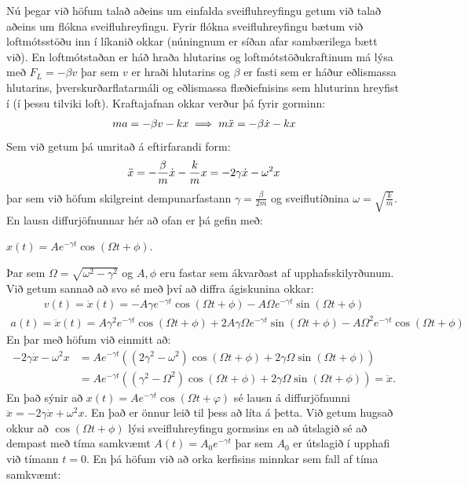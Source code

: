 \ifdefined \wholebook \else\documentclass[oneside]{book}\usepackage{EdlBook}\graphicspath{{figures/}}
\begin{document}
Nú þegar við höfum talað aðeins um einfalda sveifluhreyfingu getum við talað aðeins um flókna sveifluhreyfingu. Fyrir flókna sveifluhreyfingu bætum við loftmótsstöðu inn í líkanið okkar (núningnum er síðan afar sambærilega bætt við). En loftmótstaðan er háð hraða hlutarins og loftmótstöðukraftinum má lýsa með $F_L = -\beta v$ þar sem $v$ er hraði hlutarins og $\beta$ er fasti sem er háður eðlismassa hlutarins, þverskurðarflatarmáli og eðlismassa flæðiefnisins sem hluturinn hreyfist í (í þessu tilviki loft). Kraftajafnan okkar verður þá fyrir gorminn:
\begin{align*}
    ma = -\beta v - kx \implies m\Ddot{x} = -\beta \dot{x} - kx
\end{align*}
Sem við getum þá umritað á eftirfarandi form:
\begin{align*}
    \Ddot{x} = - \frac{\beta}{m}\dot{x} - \frac{k}{m}x = -2\gamma \dot{x} - \omega^2 x
\end{align*}
þar sem við höfum skilgreint dempunarfastann $\gamma = \frac{\beta}{2m}$ og sveiflutíðnina $\omega = \sqrt{\frac{k}{m}}$. En lausn diffurjöfnunnar hér að ofan er þá gefin með:
\begin{center}
\begin{tcbox}[nobeforeafter]{$x(t) = Ae^{-\gamma t} \cos(\Omega t + \phi).$}
\end{tcbox}
\end{center}
Þar sem $\Omega = \sqrt{\omega^2 - \gamma^2}$ og $A, \phi$ eru fastar sem ákvarðast af upphafsskilyrðunum. Við getum sannað að svo sé með því að diffra ágiskunina okkar:
\begin{align*}
    v(t) = \dot{x}(t) = -A\gamma e^{-\gamma t}\cos(\Omega t + \phi) - A\Omega e^{-\gamma t}\sin(\Omega t + \phi)
\end{align*}
\begin{align*}
    a(t) = \ddot{x}(t) = A\gamma^2 e^{-\gamma t}\cos(\Omega t + \phi) + 2A\gamma \Omega e^{-\gamma t}\sin(\Omega t + \phi) - A\Omega^2 e^{-\gamma t}\cos(\Omega t + \phi)
\end{align*}
En þar með höfum við einmitt að:
\begin{align*}
    -2\gamma \dot{x} - \omega^2 x &= Ae^{-\gamma t} \left( \left( 2\gamma^2  -\omega^2 \right)\cos(\Omega t + \phi) + 2\gamma \Omega \sin(\Omega t + \phi) \right) \\
    &= Ae^{-\gamma t} \left( \left( \gamma^2  -\Omega^2 \right)\cos(\Omega t + \phi) + 2\gamma \Omega \sin(\Omega t + \phi) \right) = \ddot{x}.
\end{align*}
En það sýnir að $x(t) = Ae^{-\gamma t}\cos(\Omega t + \varphi)$ sé lausn á diffurjöfnunni $\ddot{x} = -2\gamma \dot{x} + \omega^2 x$. En það er önnur leið til þess að líta á þetta. Við getum hugsað okkur að $\cos(\Omega t + \phi)$ lýsi sveifluhreyfingu gormsins en að útslagið sé að dempast með tíma samkvæmt $A(t) = A_0 e^{-\gamma t}$ þar sem $A_0$ er útslagið í upphafi við tímann $t = 0$. En þá höfum við að orka kerfisins minnkar sem fall af tíma samkvæmt:
\end{document}
